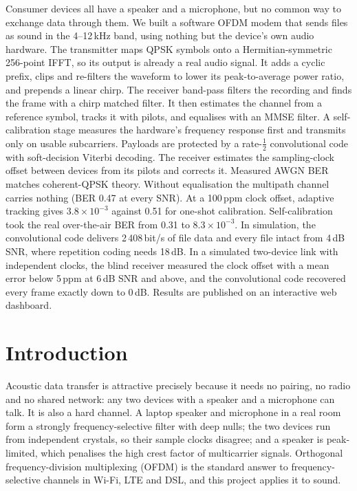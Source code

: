 \documentclass[11pt,a4paper]{report}
\begin{document}
Consumer devices all have a speaker and a microphone, but no common way to exchange
data through them. We built a software OFDM modem that sends files as sound in the
4--12\,kHz band, using nothing but the device's own audio hardware. The transmitter
maps QPSK symbols onto a Hermitian-symmetric 256-point IFFT, so its output is already
a real audio signal. It adds a cyclic prefix, clips and re-filters the waveform to
lower its peak-to-average power ratio, and prepends a linear chirp. The receiver
band-pass filters the recording and finds the frame with a chirp matched filter.
It then estimates the channel from a reference symbol, tracks it with pilots, and
equalises with an MMSE filter. A self-calibration stage measures the hardware's
frequency response first and transmits only on usable subcarriers. Payloads are
protected by a rate-$\tfrac12$ convolutional code with soft-decision Viterbi
decoding. The receiver estimates the sampling-clock offset between devices from its
pilots and corrects it. Measured AWGN BER matches coherent-QPSK theory. Without
equalisation the multipath channel carries nothing (BER 0.47 at every SNR). At a
100\,ppm clock offset, adaptive tracking gives $3.8\times10^{-3}$ against 0.51 for
one-shot calibration. Self-calibration took the real over-the-air BER from 0.31 to
$8.3\times10^{-3}$. In simulation, the convolutional code delivers 2\,408\,bit/s of
file data and every file intact from 4\,dB SNR, where repetition coding needs 18\,dB.
In a simulated two-device link with independent clocks, the blind receiver measured
the clock offset with a mean error below 5\,ppm at 6\,dB SNR and above, and the
convolutional code recovered every frame exactly down to 0\,dB. Results are published on an
interactive web dashboard.

\chapter{Introduction}

Acoustic data transfer is attractive precisely because it needs no pairing, no
radio and no shared network: any two devices with a speaker and a microphone can
talk. It is also a hard channel. A laptop speaker and microphone in a real room form
a strongly frequency-selective filter with deep nulls; the two devices run from
independent crystals, so their sample clocks disagree; and a speaker is
peak-limited, which penalises the high crest factor of multicarrier signals.
Orthogonal frequency-division multiplexing (OFDM) is the standard answer to
frequency-selective channels in Wi-Fi, LTE and DSL, and this project applies it to
sound.
\end{document}
